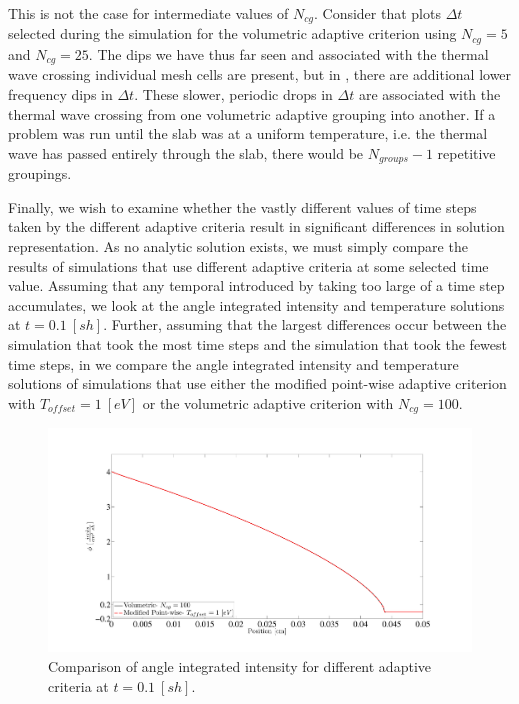 This is not the case for intermediate values of $N_{cg}$.  
Consider  that plots $\Delta t$ selected during the simulation for the volumetric adaptive criterion using $N_{cg}=5$ and $N_{cg}=25$.
The dips we have thus far seen and associated with the thermal wave crossing individual mesh cells are present, but in , there are additional lower frequency dips in $\Delta t$.
These slower, periodic drops in $\Delta t$ are associated with the thermal wave crossing from one volumetric adaptive grouping into another.  
If a problem was run until the slab was at a uniform temperature, i.e. the thermal wave has passed entirely through the slab, there would be $N_{groups}-1$ repetitive groupings.

Finally, we wish to examine whether the vastly different values of time steps taken by the different adaptive criteria result in significant differences in solution representation.
As no analytic solution exists, we must simply compare the results of simulations that use different adaptive criteria at some selected time value.
Assuming that any temporal introduced by taking too large of a time step accumulates, we look at the angle integrated intensity and temperature solutions at $t=0.1~[sh]$.
Further, assuming that the largest differences occur between the simulation that took the most time steps and the simulation that took the fewest time steps, in  we compare the angle integrated intensity and temperature solutions of simulations that use either the modified point-wise adaptive criterion with $T_{offset} = 1~[eV]$ or the volumetric adaptive criterion with $N_{cg}=100$.
\begin{figure}[!htp]
\centering
\includegraphics[width=16cm,trim=2in  0.4in 0.5in 0.75in,clip=true]{chapter6_grey_radtran/Dissertation_Data/100C_Physical_Marshak_Wave_Radiation_Adaptive_Comparison_Final_1eV.pdf}
\caption{Comparison of angle integrated intensity for different adaptive criteria at $t=0.1~[sh]$.}
\label{fig:time_difference_radiation}
\end{figure}

